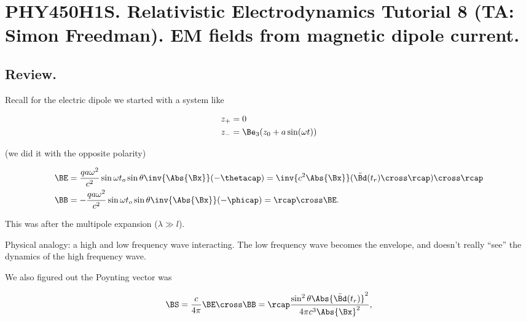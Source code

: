 
%

\chapter{PHY450H1S.  Relativistic Electrodynamics Tutorial 8 (TA: Simon Freedman).  EM fields from magnetic dipole current.}
\label{chap:relativisticElectrodynamicsT8}
{}
\date{Mar 23, 2011}

\beginArtWithToc

\section{Review.}

Recall for the electric dipole we started with a system like

\begin{align}\label{eqn:relativisticElectrodynamicsL21:10}
z_{+} &= 0 \\
z_{-} &= \Be_3( z_0 + a \sin(\omega t))
\end{align}

(we did it with the opposite polarity)

\begin{align}\label{eqn:relativisticElectrodynamicsT8:10}
\BE &= \frac{q a \omega^2}{c^2} \sin\omega t_o \sin\theta \inv{\Abs{\Bx}} (- \thetacap ) = \inv{c^2 \Abs{\Bx}} (\ddot{\Bd}(t_r) \cross \rcap ) \cross \rcap  \\
\BB &= -\frac{q a \omega^2}{c^2} \sin\omega t_o \sin\theta \inv{\Abs{\Bx}} (- \phicap ) = \rcap \cross \BE.
\end{align}

This was after the multipole expansion ($\lambda \gg l$).

Physical analogy: a high and low frequency wave interacting.  The low frequency wave becomes the envelope, and doesn't really ``see'' the dynamics of the high frequency wave.

We also figured out the Poynting vector was

\begin{equation}\label{eqn:relativisticElectrodynamicsT8:30}
\BS = \frac{c}{4\pi} \BE \cross \BB = \rcap \frac{ \sin^2 \theta \Abs{\ddot{\Bd}(t_r) }^2 }{ 4 \pi c^3 \Abs{\Bx}^2},
\end{equation}

